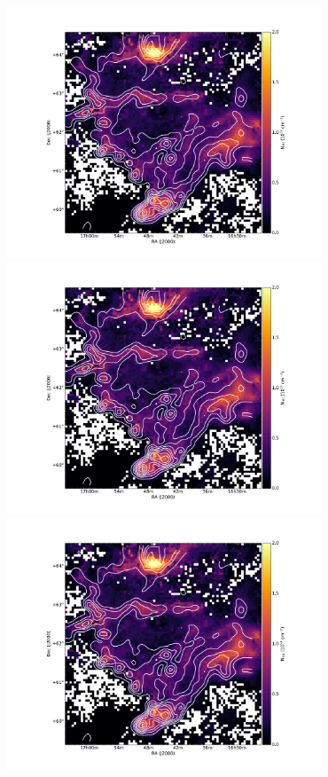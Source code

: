 \documentclass[traditabstract]{aa}
\begin{document}



\begin{figure}[h]
  \centering
  \includegraphics[page=1,height=7.5cm,trim=45 5 65 35,clip=true]{Figures/GHIGLS_NHI.pdf}
  \hspace{3mm}
  \includegraphics[page=4,height=7.5cm,trim=45 5 65 35,clip=true]{Figures/GHIGLS_NHI.pdf} \\
  \vspace{3mm}
  \includegraphics[page=2,height=7.5cm,trim=45 5 65 35,clip=true]{Figures/GHIGLS_NHI.pdf}

\end{figure}
\end{document}
